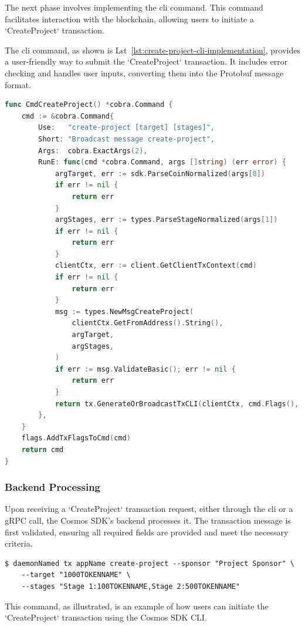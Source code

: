 The next phase involves implementing the \gls{cli} command. This command facilitates interaction with the blockchain, allowing users to initiate a `CreateProject` transaction.

The \gls{cli} command, as shown is Lst~\ref{lst:create-project-cli-implementation}, provides a user-friendly way to submit the `CreateProject` transaction. It includes error checking and handles user inputs, converting them into the Protobuf message format.

\newpage
\begin{lstlisting}[language=go, caption=CreateProject CLI protobuf definition, label={lst:create-project-cli-implementation}]
func CmdCreateProject() *cobra.Command {
	cmd := &cobra.Command{
		Use:   "create-project [target] [stages]",
		Short: "Broadcast message create-project",
		Args:  cobra.ExactArgs(2),
		RunE: func(cmd *cobra.Command, args []string) (err error) {
			argTarget, err := sdk.ParseCoinNormalized(args[0])
			if err != nil {
				return err
			}
			argStages, err := types.ParseStageNormalized(args[1])
			if err != nil {
				return err
			}
			clientCtx, err := client.GetClientTxContext(cmd)
			if err != nil {
				return err
			}
			msg := types.NewMsgCreateProject(
				clientCtx.GetFromAddress().String(),
				argTarget,
				argStages,
			)
			if err := msg.ValidateBasic(); err != nil {
				return err
			}
			return tx.GenerateOrBroadcastTxCLI(clientCtx, cmd.Flags(), msg)
		},
	}
	flags.AddTxFlagsToCmd(cmd)
	return cmd
}
\end{lstlisting}

\subsubsection{Backend Processing}

Upon receiving a `CreateProject` transaction request, either through the \gls{cli} or a gRPC call, the Cosmos SDK's backend processes it. The transaction message is first validated, ensuring all required fields are provided and meet the necessary criteria.

\begin{verbatim}
$ daemonNamed tx appName create-project --sponsor "Project Sponsor" \
    --target "1000TOKENNAME" \
    --stages "Stage 1:100TOKENNAME,Stage 2:500TOKENNAME"
\end{verbatim}

This command, as illustrated, is an example of how users can initiate the `CreateProject` transaction using the Cosmos SDK CLI.

